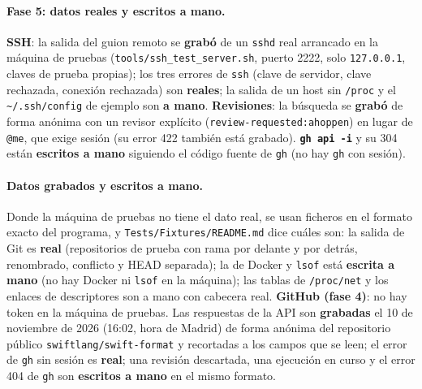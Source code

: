 \documentclass[11pt,a4paper]{article}
\begin{document}
\paragraph{Fase 5: datos reales y escritos a mano.} \textbf{SSH}: la
salida del guion remoto se \textbf{grabó} de un \texttt{sshd} real
arrancado en la máquina de pruebas (\texttt{tools/ssh\_test\_server.sh},
puerto 2222, solo \texttt{127.0.0.1}, claves de prueba propias); los
tres errores de \texttt{ssh} (clave de servidor, clave rechazada,
conexión rechazada) son \textbf{reales}; la salida de un host sin
\texttt{/proc} y el \texttt{\textasciitilde/.ssh/config} de ejemplo
son \textbf{a mano}. \textbf{Revisiones}: la búsqueda se
\textbf{grabó} de forma anónima con un revisor explícito
(\texttt{review-requested:ahoppen}) en lugar de \texttt{@me}, que
exige sesión (su error 422 también está grabado). \textbf{\texttt{gh
api -i}} y su 304 están \textbf{escritos a mano} siguiendo el código
fuente de \texttt{gh} (no hay \texttt{gh} con sesión).

\paragraph{Datos grabados y escritos a mano.} Donde la máquina de
pruebas no tiene el dato real, se usan ficheros en el formato exacto
del programa, y \texttt{Tests/Fixtures/README.md} dice cuáles son:
la salida de Git es \textbf{real} (repositorios de prueba con rama
por delante y por detrás, renombrado, conflicto y HEAD separada); la
de Docker y \texttt{lsof} está \textbf{escrita a mano} (no hay Docker
ni \texttt{lsof} en la máquina); las tablas de \texttt{/proc/net} y
los enlaces de descriptores son a mano con cabecera real.
\textbf{GitHub (fase 4)}: no hay token en la máquina de pruebas. Las
respuestas de la API son \textbf{grabadas} el 10 de noviembre de 2026
(16:02, hora de Madrid) de forma anónima del repositorio público
\texttt{swiftlang/swift-format} y recortadas a los campos que se
leen; el error de \texttt{gh} sin sesión es \textbf{real}; una
revisión descartada, una ejecución en curso y el error 404 de
\texttt{gh} son \textbf{escritos a mano} en el mismo formato.
\end{document}

